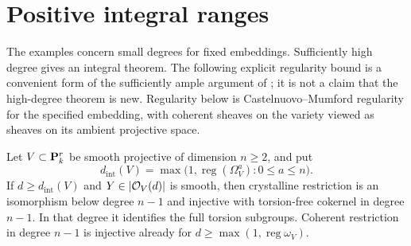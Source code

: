 \section{Positive integral ranges}\label{sec:positive}

The examples concern small degrees for fixed embeddings. Sufficiently high degree gives an integral theorem. The following explicit regularity bound is a convenient form of the sufficiently ample argument of \citet[Lemma 2.12, pp.~242--243]{BMS}; it is not a claim that the high-degree theorem is new. Regularity below is Castelnuovo--Mumford regularity for the specified embedding, with coherent sheaves on the variety viewed as sheaves on its ambient projective space.

\begin{theorem}\label{thm:regularity}
Let $V\subset\mathbf P^r_k$ be smooth projective of dimension $n\ge2$, and put
\[
 d_{\mathrm{int}}(V)=\max\bigl(1,\operatorname{reg}(\Omega_V^a):0\le a\le n\bigr).
\]
If $d\ge d_{\mathrm{int}}(V)$ and $Y\in|\mathcal O_V(d)|$ is smooth, then crystalline restriction is an isomorphism below degree $n-1$ and injective with torsion-free cokernel in degree $n-1$. In that degree it identifies the full torsion subgroups. Coherent restriction in degree $n-1$ is injective already for
$d\ge\max(1,\operatorname{reg}\omega_V)$.
\end{theorem}
